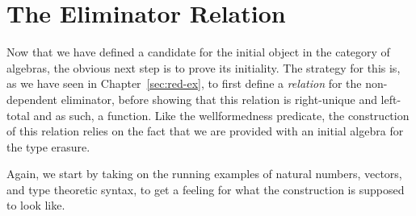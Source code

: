 \section{The Eliminator Relation}

Now that we have defined a candidate for the initial object in the category of
algebras,
the obvious next step is to prove its initiality.
The strategy for this is, as we have seen in Chapter~\ref{sec:red-ex},
to first define a \emph{relation} for the non-dependent eliminator, before showing
that this relation is right-unique and left-total and as such, a function.
Like the wellformedness predicate, the construction of this relation
relies on the fact that we are provided with an initial algebra for the type
erasure.

Again, we start by taking on the running examples of natural numbers, vectors,
and type theoretic syntax, to get a feeling for what the construction is supposed
to look like.

